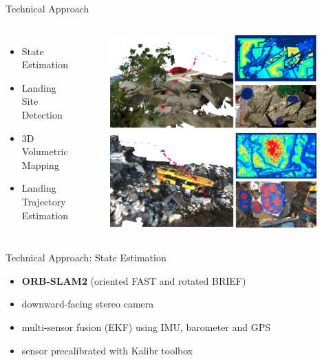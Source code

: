 \documentclass[10pt]{beamer}
\begin{document}
    \begin{frame}{Technical Approach}
        \begin{columns}[c,onlytextwidth]
            \begin{itemize}
                \item State Estimation
                \item Landing Site Detection
                \item 3D Volumetric Mapping
                \item Landing Trajectory Estimation
            \end{itemize}
                \begin{figure}
                    \includegraphics[width=0.96\textwidth,right]{images/Fig1.png}
                \end{figure}
        \end{columns}
    \end{frame}

    \begin{frame}{Technical Approach: State Estimation}
        \justifying
        \begin{itemize}
            \item \textbf{ORB-SLAM2} (oriented FAST and rotated BRIEF)
            \item downward-facing stereo camera
            \item multi-sensor fusion (EKF) using IMU, barometer and GPS
            \item sensor precalibrated with Kalibr toolbox
        \end{itemize}
    \end{frame}
\end{document}
